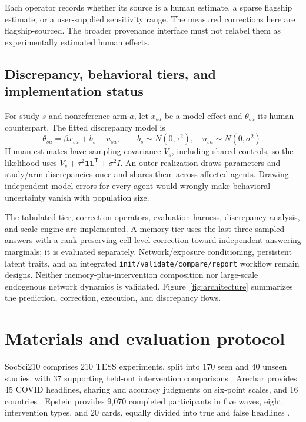 \documentclass[11pt]{article}
\begin{document}
Each operator records whether its source is a human estimate, a sparse flagship estimate, or a user-supplied sensitivity range. The measured corrections here are flagship-sourced. The broader provenance interface must not relabel them as experimentally estimated human effects.

\subsection{Discrepancy, behavioral tiers, and implementation status}
For study $s$ and nonreference arm $a$, let $x_{sa}$ be a model effect and $\theta_{sa}$ its human counterpart. The fitted discrepancy model is
\begin{equation}
\theta_{sa}=\beta x_{sa}+b_s+u_{sa},\qquad
b_s\sim N(0,\tau^2),\quad u_{sa}\sim N(0,\sigma^2).
\label{eq:discrepancy}
\end{equation}
Human estimates have sampling covariance $V_s$, including shared controls, so the likelihood uses $V_s+\tau^2\mathbf{1}\mathbf{1}^{\mathsf T}+\sigma^2 I$. An outer realization draws parameters and study/arm discrepancies once and shares them across affected agents. Drawing independent model errors for every agent would wrongly make behavioral uncertainty vanish with population size.

The tabulated tier, correction operators, evaluation harness, discrepancy analysis, and scale engine are implemented. A memory tier uses the last three sampled answers with a rank-preserving cell-level correction toward independent-answering marginals; it is evaluated separately. Network/exposure conditioning, persistent latent traits, and an integrated \texttt{init/validate/compare/report} workflow remain designs. Neither memory-plus-intervention composition nor large-scale endogenous network dynamics is validated. Figure~\ref{fig:architecture} summarizes the prediction, correction, execution, and discrepancy flows.

\section{Materials and evaluation protocol}
SocSci210 comprises 210 TESS experiments, split into 170 seen and 40 unseen studies, with 37 supporting held-out intervention comparisons \citep{kolluri2025,tess}.
Arechar provides 45 COVID headlines, sharing and accuracy judgments on six-point scales, and 16 countries \citep{arechar2023}.
Epstein provides 9,070 completed participants in five waves, eight intervention types, and 20 cards, equally divided into true and false headlines \citep{epstein2021}.
\end{document}
